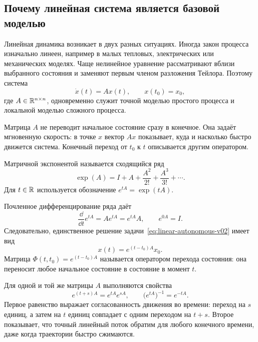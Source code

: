 \subsection{Почему линейная система является базовой моделью}

Линейная динамика возникает в двух разных ситуациях. Иногда закон процесса изначально линеен, например в малых тепловых, электрических или механических моделях. Чаще нелинейное уравнение рассматривают вблизи выбранного состояния и заменяют первым членом разложения Тейлора. Поэтому система
\begin{equation}
\label{eq:linear-autonomous-v02}
\dot x(t)=Ax(t),
\qquad
x(t_0)=x_0,
\end{equation}
где $A\in\mathbb{R}^{n\times n}$, одновременно служит точной моделью простого процесса и локальной моделью сложного процесса.

Матрица $A$ не переводит начальное состояние сразу в конечное. Она задаёт мгновенную скорость: в точке $x$ вектор $Ax$ показывает, куда и насколько быстро движется система. Конечный переход от $t_0$ к $t$ описывается другим оператором.

\begin{definition}
Матричной экспонентой называется сходящийся ряд
\begin{equation}
\label{eq:matrix-exponential-definition-v02}
\exp(A)
=
I+A+\frac{A^2}{2!}+\frac{A^3}{3!}+\cdots.
\end{equation}
Для $t\in\mathbb{R}$ используется обозначение $e^{tA}=\exp(tA)$.
\end{definition}

Почленное дифференцирование ряда даёт
\[
\frac{\dd}{\dd t}e^{tA}=Ae^{tA}=e^{tA}A,
\qquad
 e^{0A}=I.
\]
Следовательно, единственное решение задачи~\eqref{eq:linear-autonomous-v02} имеет вид
\begin{equation}
\label{eq:linear-autonomous-solution-v02}
x(t)=e^{(t-t_0)A}x_0.
\end{equation}
Матрица $\Phi(t,t_0)=e^{(t-t_0)A}$ называется оператором перехода состояния: она переносит любое начальное состояние в состояние в момент $t$.

Для одной и той же матрицы $A$ выполняются свойства
\begin{equation}
\label{eq:matrix-exponential-flow-properties-v02}
e^{(t+s)A}=e^{tA}e^{sA},
\qquad
\bigl(e^{tA}\bigr)^{-1}=e^{-tA}.
\end{equation}
Первое равенство выражает согласованность движения во времени: переход на $s$ единиц, а затем на $t$ единиц совпадает с одним переходом на $t+s$. Второе показывает, что точный линейный поток обратим для любого конечного времени, даже когда траектории быстро сжимаются.


